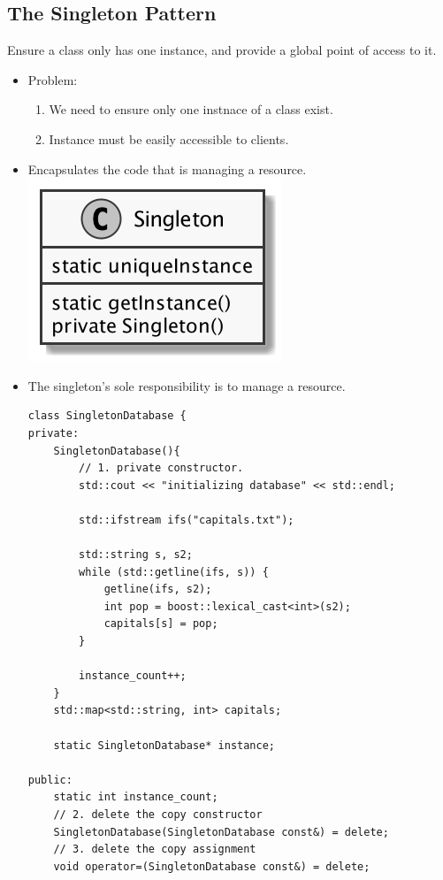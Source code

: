 \documentclass[11pt]{article}
\begin{document}
    \subsection{The Singleton Pattern}
    Ensure a class only has one instance, and provide a global point of access to it.
    \begin{itemize}
        \item Problem:
        \begin{enumerate}
            \item We need to ensure only one instnace of a class exist.
            \item Instance must be easily accessible to clients.
        \end{enumerate}
        \item Encapsulates the code that is managing a resource. \\
        \includegraphics[scale=0.2]{singleton/1__singleton}
        \item The singleton's sole responsibility is to manage a resource.
        \begin{multicols}{2}
            \begin{lstlisting}
class SingletonDatabase {
private:
    SingletonDatabase(){
        // 1. private constructor.
        std::cout << "initializing database" << std::endl;

        std::ifstream ifs("capitals.txt");

        std::string s, s2;
        while (std::getline(ifs, s)) {
            getline(ifs, s2);
            int pop = boost::lexical_cast<int>(s2);
            capitals[s] = pop;
        }

        instance_count++;
    }
    std::map<std::string, int> capitals;

    static SingletonDatabase* instance;

public:
    static int instance_count;
    // 2. delete the copy constructor
    SingletonDatabase(SingletonDatabase const&) = delete;
    // 3. delete the copy assignment
    void operator=(SingletonDatabase const&) = delete;


\end{lstlisting}
\end{multicols}
\end{itemize}
\end{document}
